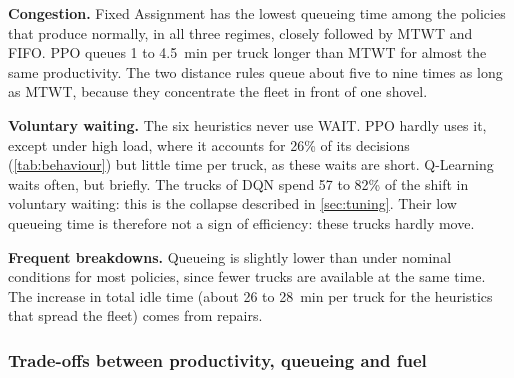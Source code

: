 \documentclass[11pt,a4paper]{article}
\newif\ifrevmarks
\newcommand{\revtag}[1]{\ifrevmarks\textsuperscript{\textcolor{red!70!black}{\scriptsize[#1]}}\fi}
\newenvironment{revbloc}[1]{\par\ifrevmarks\color{revcolor}\noindent\revtag{#1}\ \fi}{\par}
\newif\ifcorrmarks
\newcommand{\corr}[1]{\ifcorrmarks\textcolor{corrcolor}{#1}\else#1\fi}
\begin{document}
\begin{revbloc}{T31}
\textbf{Congestion.} Fixed Assignment has the lowest queueing time among the policies that produce normally, in all three regimes, closely followed by MTWT and FIFO. PPO queues \corr{1 to 4.5~min per truck longer than MTWT} for almost the same productivity. The two distance rules \corr{queue about five to nine times as long as MTWT}, because they concentrate the fleet in front of one shovel.

\textbf{Voluntary waiting.} The six heuristics never use WAIT. PPO hardly uses it, except under high load, where it accounts for 26\% of its decisions \corr{(\cref{tab:behaviour}) but little time per truck}, as these waits are short. \corr{Q-Learning waits often, but briefly. The trucks of DQN spend 57 to 82\% of the shift in voluntary waiting:} this is the collapse described in \cref{sec:tuning}. Their low queueing time is therefore not a sign of efficiency: these trucks hardly move.

\textbf{Frequent breakdowns.} Queueing is slightly lower than under nominal conditions for most policies, since fewer trucks are available at the same time. The increase in total idle time (about 26 to 28~min per truck for the heuristics that spread the fleet) comes from repairs.
\end{revbloc}

\subsubsection{Trade-offs between productivity, queueing and fuel}
\label{sec:pareto}
\end{document}
